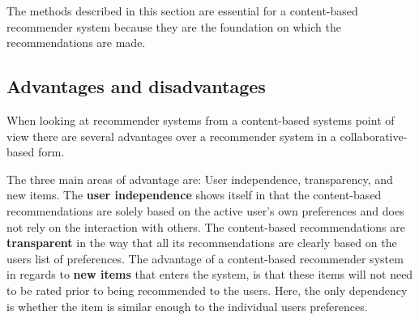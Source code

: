 
The methods described in this section are essential for a content-based recommender system because they are the foundation on which the recommendations are made.

\subsection{Advantages and disadvantages}
When looking at recommender systems from a content-based systems point of view there are several advantages over a recommender system in a collaborative-based form.\newline

The three main areas of advantage are: User independence, transparency, and new items.\newline
The \textbf{user independence} shows itself in that the content-based recommendations are solely based on the active user's own preferences and does not rely on the interaction with others.\newline
The content-based recommendations are \textbf{transparent} in the way that all its recommendations are clearly based on the users list of preferences.\newline
The advantage of a content-based recommender system in regards to \textbf{new items} that enters the system, is that these items will not need to be rated prior to being recommended to the users. Here, the only dependency is whether the item is similar enough to the individual users preferences.\newline

